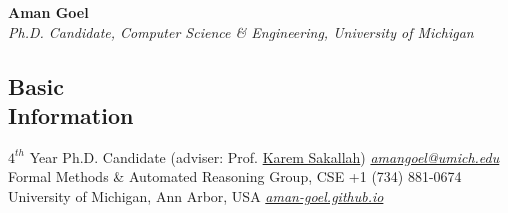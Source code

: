 \documentclass[margin,line,letter]{resume}
\begin{document}
\thispagestyle{empty}
{\sc \LARGE \phantom{xx}\hspace{25ex} \textbf{Aman Goel} 
\vspace{0.3cm}
\\
\large \emph{\phantom{xx}\hspace{11ex} Ph.D. Candidate, Computer Science \& Engineering, University of Michigan}}
\begin{resume}
    

\section{\mysidestyle Basic\\Information}
    $4^{th}$ Year Ph.D. Candidate (adviser: Prof. \href{http://web.eecs.umich.edu/~karem/}{Karem Sakallah})                       \hfill \href{mailto:amangoel@umich.edu}{\textit{amangoel@umich.edu}} \phantom{xx}\hspace{1ex} \faEnvelope \\
    Formal Methods \& Automated Reasoning Group, CSE 
     \hfill +1 (734) 881-0674 \phantom{xx}\hspace{1ex} \faPhone \\
    University of Michigan, Ann Arbor, USA      \hfill \href{https://aman-goel.github.io/}{\textit{aman-goel.github.io}} \phantom{xx}\hspace{1ex} \faExternalLink
    


\end{resume}
\end{document}
